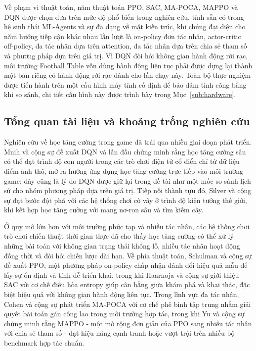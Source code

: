 \indent Về phạm vi thuật toán, năm thuật toán PPO, SAC, MA-POCA, MAPPO và DQN được chọn
dựa trên mức độ phổ biến trong nghiên cứu, tính sẵn có trong hệ sinh thái ML-Agents và
sự đa dạng về mặt kiến trúc, khi chúng đại diện cho năm hướng tiếp cận khác nhau lần
lượt là on-policy đơn tác nhân, actor-critic off-policy, đa tác nhân dựa trên attention,
đa tác nhân dựa trên chia sẻ tham số và phương pháp dựa trên giá trị. Vì DQN đòi hỏi
không gian hành động rời rạc, môi trường Football Table vốn dùng hành động liên tục
phải được dựng lại thành một bản riêng có hành động rời rạc dành cho lần chạy này.
Toàn bộ thực nghiệm được tiến hành trên một cấu hình máy
tính cố định để bảo đảm tính công bằng khi so sánh, chi tiết cấu hình này được trình
bày trong Mục~\ref{sub:hardware}.

\subsection{Tổng quan tài liệu và khoảng trống nghiên cứu}

\indent Nghiên cứu về học tăng cường trong game đã trải qua nhiều giai đoạn phát triển.
Mnih và cộng sự \cite{mnih2015humanlevel} đề xuất DQN và lần đầu chứng minh rằng học
tăng cường sâu có thể đạt trình độ con người trong các trò chơi điện tử cổ điển chỉ từ
dữ liệu điểm ảnh thô, mở ra hướng ứng dụng học tăng cường trực tiếp vào môi trường
game; đây cũng là lý do DQN được giữ lại trong đề tài như một mốc so sánh lịch sử cho
nhóm phương pháp dựa trên giá trị. Tiếp nối
thành tựu đó, Silver và cộng sự \cite{silver2016mastering, silver2017mastering} đạt
bước đột phá với các hệ thống chơi cờ vây ở trình độ kiện tướng thế giới, khi kết hợp
học tăng cường với mạng nơ-ron sâu và tìm kiếm cây.

\indent Ở quy mô lớn hơn với môi trường phức tạp và nhiều tác nhân, các hệ thống chơi
trò chơi chiến thuật thời gian thực \cite{openai2019dota, vinyals2019grandmaster} đã
cho thấy học tăng cường có thể xử lý những bài toán với không gian trạng thái khổng
lồ, nhiều tác nhân hoạt động đồng thời và đòi hỏi chiến lược dài hạn. Về phía thuật
toán, Schulman và cộng sự \cite{schulman2017proximal} đề xuất PPO, một phương pháp
on-policy chấp nhận đánh đổi hiệu quả mẫu để lấy sự ổn định và tính dễ triển khai,
trong khi Haarnoja và cộng sự
\cite{haarnoja2018soft} giới thiệu SAC với cơ chế điều hòa entropy giúp cân bằng giữa
khám phá và khai thác, đặc biệt hiệu quả với không gian hành động liên tục. Trong lĩnh
vực đa tác nhân, Cohen và cộng sự \cite{cohen2022mapoca} phát triển MA-POCA với cơ chế
phê bình tập trung nhằm giải quyết bài toán gán công lao trong môi trường hợp tác,
trong khi Yu và cộng sự \cite{yu2022surprising} chứng minh rằng MAPPO - một mở rộng đơn
giản của PPO sang nhiều tác nhân với chia sẻ tham số - đạt hiệu năng cạnh tranh hoặc
vượt trội trên nhiều bộ benchmark hợp tác chuẩn.

